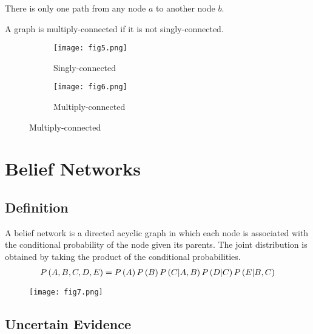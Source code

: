 \begin{description}[leftmargin=0cm]	
	\item[Singly-connected] There is only one path from any node $a$ to another node $b$.
	\item[Multiply-connected] A graph is multiply-connected if it is not singly-connected.
		\begin{figure*}[h]
			\centering
			\begin{subfigure}[b]{0.45\textwidth}
				\centering
				\texttt{[image: fig5.png]}
				\caption*{Singly-connected}
			\end{subfigure}
			\begin{subfigure}[b]{0.45\textwidth}
				\centering
				\texttt{[image: fig6.png]}
				\caption*{Multiply-connected}
			\end{subfigure}
		\end{figure*}
\end{description}

\section{Belief Networks}

\subsection{Definition}

A belief network is a directed acyclic graph in which each node is associated with the conditional probability of the node given its parents. The joint distribution is obtained by taking the product of the conditional probabilities.
	\begin{align*}
	\P{A,B,C,D,E}=\P{A}\P{B}\P{C|A,B}\P{D|C}\P{E|B,C}
	\end{align*}
	\begin{figure*}[h]
		\centering
		\texttt{[image: fig7.png]}
	\end{figure*}

\subsection{Uncertain Evidence}

